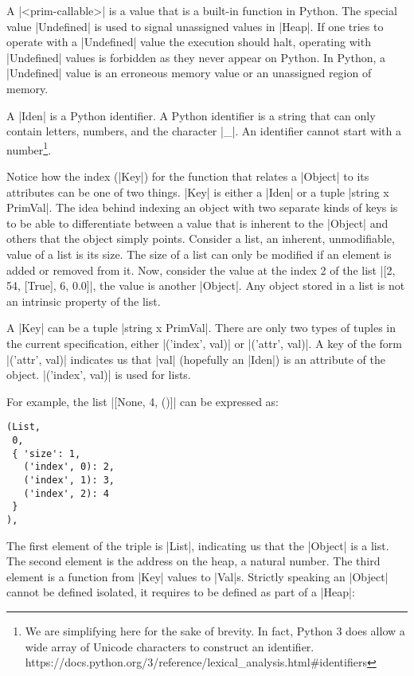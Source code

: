 A \pycode|<prim-callable>| is a value that is
a built-in function in Python. The special value \pycode|Undefined| is used
to signal unassigned values in \pycode|Heap|. If one tries to operate
with a \pycode|Undefined| value the execution should halt, operating
with \pycode|Undefined| values is forbidden as they never appear on
Python. In Python, a \pycode|Undefined| value is an erroneous memory
value or an unassigned region of memory.

A \pycode|Iden| is a Python identifier. A Python identifier is a string
that can only contain letters, numbers, and the character \pycode|_|.
An identifier cannot start with a number\footnote{We are simplifying here
  for the sake of brevity. In fact, Python 3 does allow a wide array of
  Unicode characters to construct an identifier.
  https://docs.python.org/3/reference/lexical\_analysis.html\#identifiers}.

Notice how the index (\pycode|Key|) for the function that relates a
\pycode|Object| to its attributes can be one of two things. \pycode|Key|
is either a \pycode|Iden| or a tuple \pycode|string x PrimVal|. The
idea behind indexing an object with two separate kinds of keys is to be
able to differentiate between a value that is inherent to the
\pycode|Object| and others that the object simply points. Consider a
list, an inherent, unmodifiable, value of a list is its size. The size of
a list can only be modified if an element is added or removed from it.
Now, consider the value at the index 2 of the list
\pycode|[2, 54, [True], 6, 0.0]|, the value is another
\pycode|Object|. Any object stored in a list is not an intrinsic property
of the list.

A \pycode|Key| can be a tuple \pycode|string x PrimVal|. There are
only two types of tuples in the current specification, either
\pycode|('index', val)| or
\pycode|('attr', val)|. A key of the
form \pycode|('attr', val)| indicates
us that \pycode|val| (hopefully an \pycode|Iden|) is an attribute of the
object. \pycode|('index', val)| is
used for lists.

For example, the list \pycode|[None, 4, ()]| can be expressed as:

\begin{verbatim}
(List,
 0,
 { 'size': 1,
   ('index', 0): 2,
   ('index', 1): 3,
   ('index', 2): 4
 }
),
\end{verbatim}

The first element of the triple is \pycode|List|, indicating us that the
\pycode|Object| is a list. The second element is the address on the
heap, a natural number. The third element is a function from
\pycode|Key| values to \pycode|Val|s. Strictly speaking an
\pycode|Object| cannot be defined isolated, it requires to be defined as
part of a \pycode|Heap|:

